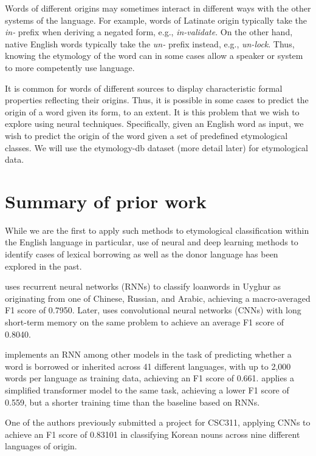 \documentclass[11pt]{article}
\begin{document}
	Words of different origins may sometimes interact in different ways with the other systems of the language.
	For example, words of Latinate origin typically take the \textit{in-} prefix when deriving a negated form, e.g., \textit{in-validate}.
	On the other hand, native English words typically take the \textit{un-} prefix instead, e.g., \textit{un-lock}.
	Thus, knowing the etymology of the word can in some cases allow a speaker or system to more competently use language.
	
	It is common for words of different sources to display characteristic formal properties reflecting their origins.
	Thus, it is possible in some cases to predict the origin of a word given its form, to an extent.
	It is this problem that we wish to explore using neural techniques.
	Specifically, given an English word as input, we wish to predict the origin of the word given a set of predefined etymological classes.
	We will use the etymology-db \cite{etymologydb} dataset (more detail later) for etymological data.
	
	\section{Summary of prior work} \label{sec:summ}  %
	
	While we are the first to apply such methods to etymological classification within the English language in particular, use of neural and deep learning methods to identify cases of lexical borrowing as well as the donor language has been explored in the past.
	
	 uses recurrent neural networks (RNNs) to classify loanwords in Uyghur as originating from one of Chinese, Russian, and Arabic, achieving a macro-averaged F1 score of 0.7950. Later,  uses convolutional neural networks (CNNs) with long short-term memory on the same problem to achieve an average F1 score of 0.8040.
	
	 implements an RNN among other models in the task of predicting whether a word is borrowed or inherited across 41 different languages, with up to 2,000 words per language as training data, achieving an F1 score of 0.661.  applies a simplified transformer model to the same task, achieving a lower F1 score of 0.559, but a shorter training time than the baseline based on RNNs.
	
	One of the authors previously submitted a project for CSC311, applying CNNs to achieve an F1 score of 0.83101 in classifying Korean nouns across nine different languages of origin.
	
\end{document}
